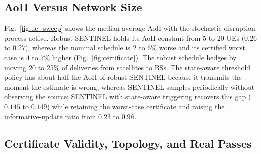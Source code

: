 \subsection{AoII Versus Network Size}

Fig.~\ref{fig:ue_sweep} shows the median average AoII with the stochastic disruption process active.
Robust SENTINEL holds its AoII constant from 5 to 20 UEs ($0.26$ to $0.27$), whereas the nominal schedule is
$2$ to $6\%$ worse and its certified worst case is $4$ to $7\%$ higher (Fig.~\ref{fig:certificate}). The robust
schedule hedges by moving 20 to 25\% of deliveries from satellites to BSs. The state-aware threshold policy has about
half the AoII of robust SENTINEL because it transmits the moment the estimate is wrong, whereas SENTINEL samples
periodically without observing the source; SENTINEL with state-aware triggering recovers this gap ($0.145$ to
$0.149$) while retaining the worst-case certificate and raising the informative-update ratio from $0.23$ to $0.96$.

\subsection{Certificate Validity, Topology, and Real Passes}


